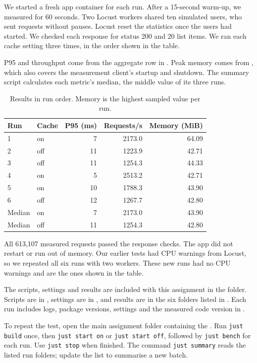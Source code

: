 \documentclass[12pt,a4paper]{article}
\begin{document}
We started a fresh app container for each run. After a 15-second warm-up, we measured for 60 seconds. Two Locust workers shared ten simulated users, who sent requests without pauses. Locust reset the statistics once the users had started. We checked each response for status 200 and 20 list items. We ran each cache setting three times, in the order shown in the table.

P95 and throughput come from the aggregate row in . Peak memory comes from , which also covers the measurement client’s startup and shutdown. The summary script calculates each metric’s median, the middle value of its three runs.

\begin{table}[htbp]
\centering
\caption{Results in run order. Memory is the highest sampled value per run.}
\label{tab:performance-results}
\small
\begin{tabular}{llrrr}
\toprule
Run & Cache & P95 (ms) & Requests/s & Memory (MiB) \\
\midrule
1 & on & 7 & 2173.0 & 64.09 \\
2 & off & 11 & 1223.9 & 42.71 \\
3 & off & 11 & 1254.3 & 44.33 \\
4 & on & 5 & 2513.2 & 42.71 \\
5 & on & 10 & 1788.3 & 43.90 \\
6 & off & 12 & 1267.7 & 42.80 \\
\midrule
Median & on & 7 & 2173.0 & 43.90 \\
Median & off & 11 & 1254.3 & 42.80 \\
\bottomrule
\end{tabular}
\end{table}

All 613,107 measured requests passed the response checks. The app did not restart or run out of memory. Our earlier tests had CPU warnings from Locust, so we repeated all six runs with two workers. These new runs had no CPU warnings and are the ones shown in the table.

The scripts, settings and results are included with this assignment in the  folder. Scripts are in , settings are in , and results are in the six folders listed in . Each run includes logs, package versions, settings and the measured code version in .

To repeat the test, open the main assignment folder containing the . Run \texttt{just build} once, then \texttt{just start on} or \texttt{just start off}, followed by \texttt{just bench} for each run. Use \texttt{just stop} when finished. The command \texttt{just summary} reads the listed run folders; update the list to summarise a new batch.
\end{document}
